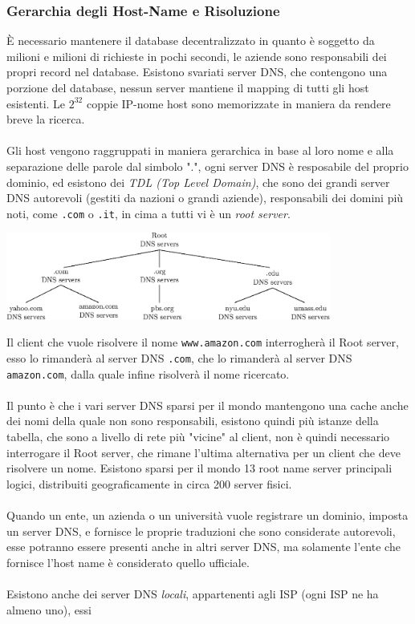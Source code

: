 \documentclass[12pt, letterpaper]{article}
\newcommand{\code}[1]{\colorbox{light-gray}{\texttt{#1}}}
\newcommand{\acc}{\\\hphantom{}\\}
\begin{document}
\subsubsection{Gerarchia degli Host-Name e Risoluzione}
È necessario mantenere il database decentralizzato in quanto è soggetto da milioni e milioni di richieste in pochi 
secondi, le aziende sono responsabili dei propri record nel database. Esistono svariati server DNS, che contengono una 
porzione del database, nessun server mantiene il mapping di tutti gli host esistenti. Le $2^{32}$ coppie 
IP-nome host sono memorizzate in maniera da rendere breve la ricerca. \acc
Gli host vengono raggruppati in maniera gerarchica in base al loro nome e alla separazione delle parole 
dal simbolo ".", ogni server DNS è resposabile del proprio dominio, ed esistono dei \textit{TDL (Top Level Domain)}, 
che sono dei grandi server DNS autorevoli (gestiti da nazioni o grandi aziende), responsabili dei domini più noti, come \code{.com} o \code{.it}, in 
cima a tutti vi è un \textit{root server}.\begin{center}
    \includegraphics[width=0.8\textwidth ]{images/DNS.eps}
\end{center}
Il client che vuole risolvere il nome \code{www.amazon.com} interrogherà il Root server, esso 
lo rimanderà al server DNS \code{.com}, che lo rimanderà al server DNS \code{amazon.com}, dalla quale infine 
risolverà il nome ricercato.\acc 
Il punto è che i vari server DNS sparsi per il mondo mantengono una cache anche dei nomi della quale non sono 
responsabili, esistono quindi più istanze della tabella, che sono a livello di rete più "vicine" al client, non è 
quindi necessario interrogare il Root server, che rimane l'ultima alternativa per un client che deve 
risolvere un nome. Esistono sparsi per il mondo 13 root name server principali logici, distribuiti 
geograficamente in circa 200 server fisici.\acc 
Quando un ente, un azienda o un università vuole registrare un dominio, imposta un server DNS, e fornisce 
le proprie traduzioni che sono considerate autorevoli, esse potranno essere presenti anche in altri server 
DNS, ma solamente l'ente che fornisce l'host name è considerato quello ufficiale.\acc
Esistono anche dei server DNS \textit{locali}, appartenenti agli ISP (ogni ISP ne ha almeno uno), essi 
\end{document}
